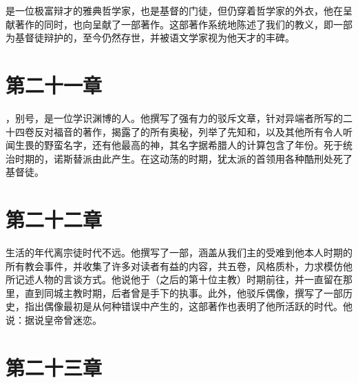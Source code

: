 是一位极富辩才的雅典哲学家，也是基督的门徒，但仍穿着哲学家的外衣，他在呈献著作的同时，也向呈献了一部著作。这部著作系统地陈述了我们的教义，即一部为基督徒辩护的，至今仍然存世，并被语文学家视为他天才的丰碑。\par


\section{第二十一章}

，别号，是一位学识渊博的人。他撰写了强有力的驳斥文章，针对异端者所写的二十四卷反对福音的著作，揭露了的所有奥秘，列举了先知和，以及其他所有令人听闻生畏的野蛮名字，还有他最高的神，其名字据希腊人的计算包含了年份。死于统治时期的，诺斯替派由此产生。在这动荡的时期，犹太派的首领用各种酷刑处死了基督徒。\par


\section{第二十二章}

生活的年代离宗徒时代不远。他撰写了一部，涵盖从我们主的受难到他本人时期的所有教会事件，并收集了许多对读者有益的内容，共五卷，风格质朴，力求模仿他所记述人物的言谈方式。他说他于（之后的第十位主教）时期前往，并一直留在那里，直到同城主教时期，后者曾是手下的执事。此外，他驳斥偶像，撰写了一部历史，指出偶像最初是从何种错误中产生的，这部著作也表明了他所活跃的时代。他说：据说皇帝曾迷恋。\par


\section{第二十三章}

